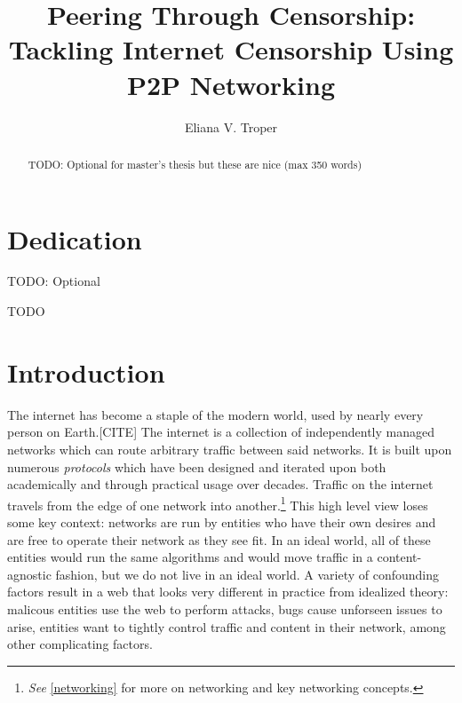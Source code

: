 \documentclass[12pt]{report}
\title{Peering Through Censorship:\\Tackling Internet Censorship Using P2P Networking}
\author{Eliana V. Troper}
\begin{document}

\maketitle    %

\begin{abstract}
TODO: Optional for master's thesis but these are nice (max 350 words)
\end{abstract}


\chapter*{Dedication}

TODO: Optional


TODO

\tableofcontents

\listoffigures  %
\listoftables   %

\newpage


\chapter{Introduction}

The internet has become a staple of the modern world, used by nearly every person on Earth.[CITE] The internet is a collection of independently managed networks which can route arbitrary traffic between said networks. It is built upon numerous \emph{protocols} which have been designed and iterated upon both academically and through practical usage over decades. Traffic on the internet travels from the edge of one network into another.\footnote{\emph{See} \ref{networking} for more on networking and key networking concepts.} This high level view loses some key context: networks are run by entities who have their own desires and are free to operate their network as they see fit. In an ideal world, all of these entities would run the same algorithms and would move traffic in a content-agnostic fashion, but we do not live in an ideal world. A variety of confounding factors result in a web that looks very different in practice from idealized theory: malicous entities use the web to perform attacks, bugs cause unforseen issues to arise, entities want to tightly control traffic and content in their network, among other complicating factors.
\end{document}

